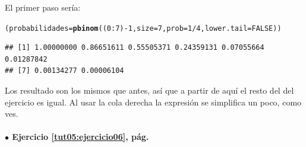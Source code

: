 \documentclass[10pt,a4paper]{article}\usepackage[]{graphicx}\usepackage[]{color}
\makeatletter
\newcommand{\hlnum}[1]{\textcolor[rgb]{0.686,0.059,0.569}{#1}}%
\newcommand{\hlopt}[1]{\textcolor[rgb]{0,0,0}{#1}}%
\newcommand{\hlstd}[1]{\textcolor[rgb]{0.345,0.345,0.345}{#1}}%
\newcommand{\hlkwb}[1]{\textcolor[rgb]{0.69,0.353,0.396}{#1}}%
\newcommand{\hlkwc}[1]{\textcolor[rgb]{0.333,0.667,0.333}{#1}}%
\newcommand{\hlkwd}[1]{\textcolor[rgb]{0.737,0.353,0.396}{\textbf{#1}}}%
\newenvironment{kframe}{%
 \def\at@end@of@kframe{}%
 \ifinner\ifhmode%
  \def\at@end@of@kframe{\end{minipage}}%
  \begin{minipage}{\columnwidth}%
 \fi\fi%
 \def\FrameCommand##1{\hskip\@totalleftmargin \hskip-\fboxsep
 \colorbox{shadecolor}{##1}\hskip-\fboxsep
     \hskip-\linewidth \hskip-\@totalleftmargin \hskip\columnwidth}%
 \MakeFramed {\advance\hsize-\width
   \@totalleftmargin\z@ \linewidth\hsize
   \@setminipage}}%
 {\par\unskip\endMakeFramed%
 \at@end@of@kframe}
\newenvironment{knitrout}{}{} %
\makeatother
\begin{document}
El primer paso sería:
\begin{knitrout}
\color{fgcolor}\begin{kframe}
\begin{alltt}
\hlstd{(probabilidades} \hlkwb{=} \hlkwd{pbinom}\hlstd{((}\hlnum{0}\hlopt{:}\hlnum{7}\hlstd{)}\hlopt{-}\hlnum{1}\hlstd{,} \hlkwc{size} \hlstd{=} \hlnum{7}\hlstd{,} \hlkwc{prob} \hlstd{=} \hlnum{1}\hlopt{/}\hlnum{4}\hlstd{,} \hlkwc{lower.tail}\hlstd{=}\hlnum{FALSE}\hlstd{))}
\end{alltt}
\begin{verbatim}
## [1] 1.00000000 0.86651611 0.55505371 0.24359131 0.07055664 0.01287842
## [7] 0.00134277 0.00006104
\end{verbatim}
\end{kframe}
\end{knitrout}
Los resultado son los mismos que antes, así que a partir de aquí el resto del del ejercicio es igual. Al usar la cola derecha la expresión se simplifica un poco, como ves.


\paragraph{\bf $\bullet$ Ejercicio \ref{tut05:ejercicio06}, pág. \pageref{tut05:ejercicio06}}
\label{tut05:ejercicio06:sol}\quad\\
\end{document}
